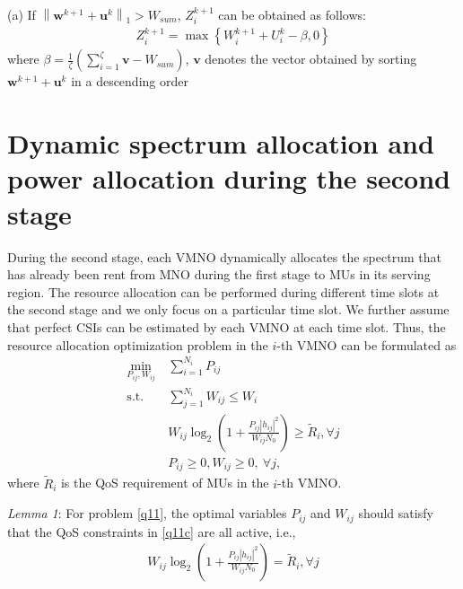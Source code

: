 \documentclass[journal]{IEEEtran}
\begin{document}
(a) If $\left\|\mathbf{w}^{k+1} + \mathbf{u}^k \right\|_1 > W_{sum}$, $Z_i^{k+1}$ can be obtained as follows:
\begin{align}
Z_i^{k+1} = \max\left\{W_i^{k+1} + U_i^k - \beta, 0\right\}
\end{align}
where $\beta = \frac{1}{\zeta}\left(\sum\limits_{i = 1}^{\zeta} \mathbf{v} - W_{sum} \right)$, $\mathbf{v}$ denotes the vector obtained by sorting $\mathbf{w}^{k+1} + \mathbf{u}^k$ in a descending order
\section{Dynamic spectrum allocation and power allocation during the second stage}
During the second stage, each VMNO dynamically allocates the spectrum that has already been rent from MNO during the first stage to MUs in its serving region. The resource allocation can be performed during different time slots at the second stage and we only focus on a particular time slot. We further assume that perfect CSIs can be estimated by each VMNO at each time slot. Thus, the resource allocation optimization problem in the $i$-th VMNO can be formulated as
\begin{subequations}\label{q11}
	\begin{align}
	\min_{P_{ij}, W_{ij}}\ & \sum\limits_{i = 1}^{N_i} P_{ij} \label{q11a} \\ \mbox{s.t.} \quad &  \sum\limits_{j = 1}^{N_i} W_{ij} \leq W_i \label{q11b} \\ \quad &  W_{ij}\log_2\left(1 + \frac{P_{ij}\left|h_{ij}\right|^2}{W_{ij}N_0}\right) \geq \tilde{R}_i, \forall j \label{q11c}\\
	& P_{ij} \geq 0, W_{ij} \geq 0, \ \forall j, \label{q11d}
	\end{align}
\end{subequations}
where $\tilde{R}_i$ is the QoS requirement of MUs in the $i$-th VMNO.

\textit{Lemma 1}: For problem \eqref{q11}, the optimal variables $P_{ij}$ and $W_{ij}$ should satisfy that the QoS constraints in \eqref{q11c} are all active, i.e., 
\begin{align}
W_{ij}\log_2\left(1 + \frac{P_{ij}\left|h_{ij}\right|^2}{W_{ij}N_0}\right) = \tilde{R}_i,  \forall j
\end{align}
\end{document}
